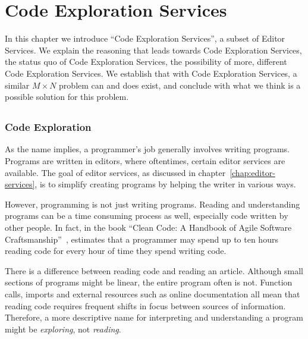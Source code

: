 
\chapter{Code Exploration Services}
\label{chap:code-exploration-services}

In this chapter we introduce ``Code Exploration Services'', a subset of Editor Services.
We explain the reasoning that leads towards Code Exploration Services, the status quo of Code Exploration Services,
the possibility of more, different Code Exploration Services.
We establish that with Code Exploration Services, a similar $M \times N$ problem can and does exist, and conclude with
what we think is a possible solution for this problem.

\section*{}
\subsection*{Code Exploration}

As the name implies, a programmer's job generally involves writing programs.
Programs are written in editors, where oftentimes, certain editor services are available.
The goal of editor services, as discussed in chapter~\ref{chap:editor-services}, is to simplify
creating programs by helping the writer in various ways.

However, programming is not just writing programs.
Reading and understanding programs can be a time consuming process as well, especially code written by other people.
In fact, in the book ``Clean Code: A Handbook of Agile Software Craftsmanship''~\autocite{martin_reading_code_ratio},
\citeauthor{martin_reading_code_ratio} estimates that a programmer may spend up to ten hours reading code for
every hour of time they spend writing code.

There is a difference between reading code and reading an article.
Although small sections of programs might be linear, the entire program often is not.
Function calls, imports and external resources such as online documentation all mean that
reading code requires frequent shifts in focus between sources of information.
Therefore, a more descriptive name for interpreting and understanding a program might be
\textit{exploring}, not \textit{reading}.

